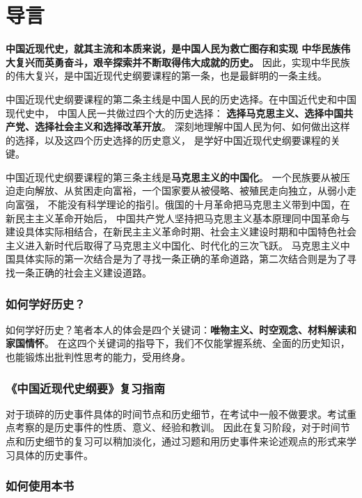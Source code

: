 \documentclass[10pt, UTF8]{book} %
\begin{document}
\chapter*{导言}
\thispagestyle{empty}

\quad\quad\textbf{中国近现代史，就其主流和本质来说，是中国人民为救亡图存和实现
中华民族伟大复兴而英勇奋斗，艰辛探索并不断取得伟大成就的历史。}
因此，实现中华民族的伟大复兴，是中国近现代史纲要课程的第一条，也是最鲜明的一条主线。

中国近现代史纲要课程的第二条主线是中国人民的历史选择。在中国近代史和中国现代史中，
中国人民一共做过四个大的历史选择：
\textbf{选择马克思主义、选择中国共产党、选择社会主义和选择改革开放}。
深刻地理解中国人民为何、如何做出这样的选择，以及这四个历史选择的历史意义，
是学好中国近现代史纲要课程的关键。

中国近现代史纲要课程的第三条主线是\textbf{马克思主义的中国化}。
一个民族要从被压迫走向解放、从贫困走向富裕，一个国家要从被侵略、被殖民走向独立，从弱小走向富强，
不能没有科学理论的指引。俄国的十月革命把马克思主义带到中国，在新民主主义革命开始后，
中国共产党人坚持把马克思主义基本原理同中国革命与建设具体实际相结合，在新民主主义革命时期、社会主义建设时期和中国特色社会主义进入新时代后取得了马克思主义中国化、时代化的三次飞跃。
马克思主义中国具体实际的第一次结合是为了寻找一条正确的革命道路，第二次结合则是为了寻找一条正确的社会主义建设道路。

\subsection*{如何学好历史？}
\setcounter{subsubsection}{0}

如何学好历史？笔者本人的体会是四个关键词：\textbf{唯物主义、时空观念、材料解读和家国情怀}。
在这四个关键词的指导下，我们不仅能掌握系统、全面的历史知识，也能锻炼出批判性思考的能力，受用终身。

\subsection*{《中国近现代史纲要》复习指南}
\setcounter{subsubsection}{0}

对于琐碎的历史事件具体的时间节点和历史细节，在考试中一般不做要求。考试重点考察的是历史事件的性质、意义、经验和教训。
因此在复习阶段，对于时间节点和历史细节的复习可以稍加淡化，通过习题和用历史事件来论述观点的形式来学习具体的历史事件。

\subsection*{如何使用本书}
\setcounter{subsubsection}{0}
\end{document}

